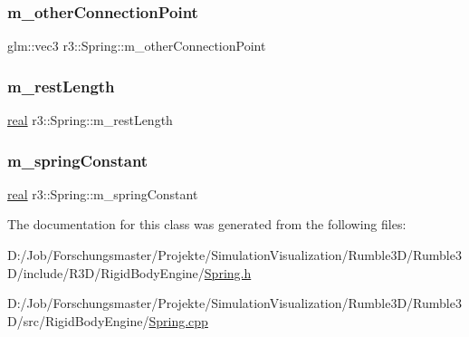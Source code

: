\subsubsection{\texorpdfstring{m\+\_\+other\+Connection\+Point}{m\_otherConnectionPoint}}
{\footnotesize\ttfamily glm\+::vec3 r3\+::\+Spring\+::m\+\_\+other\+Connection\+Point\hspace{0.3cm}{\ttfamily [protected]}}

\mbox{\label{classr3_1_1_spring_ad1c8ba98c782bee7f9896d0c868b9ee7}} 
\subsubsection{\texorpdfstring{m\+\_\+rest\+Length}{m\_restLength}}
{\footnotesize\ttfamily \mbox{\hyperlink{namespacer3_ab2016b3e3f743fb735afce242f0dc1eb}{real}} r3\+::\+Spring\+::m\+\_\+rest\+Length\hspace{0.3cm}{\ttfamily [protected]}}

\mbox{\label{classr3_1_1_spring_a06963e33fd2c3f8e25ddd345324b292b}} 
\subsubsection{\texorpdfstring{m\+\_\+spring\+Constant}{m\_springConstant}}
{\footnotesize\ttfamily \mbox{\hyperlink{namespacer3_ab2016b3e3f743fb735afce242f0dc1eb}{real}} r3\+::\+Spring\+::m\+\_\+spring\+Constant\hspace{0.3cm}{\ttfamily [protected]}}



The documentation for this class was generated from the following files\+:\begin{DoxyCompactItemize}
\item 
D\+:/\+Job/\+Forschungsmaster/\+Projekte/\+Simulation\+Visualization/\+Rumble3\+D/\+Rumble3\+D/include/\+R3\+D/\+Rigid\+Body\+Engine/\mbox{\hyperlink{_spring_8h}{Spring.\+h}}\item 
D\+:/\+Job/\+Forschungsmaster/\+Projekte/\+Simulation\+Visualization/\+Rumble3\+D/\+Rumble3\+D/src/\+Rigid\+Body\+Engine/\mbox{\hyperlink{_spring_8cpp}{Spring.\+cpp}}\end{DoxyCompactItemize}
